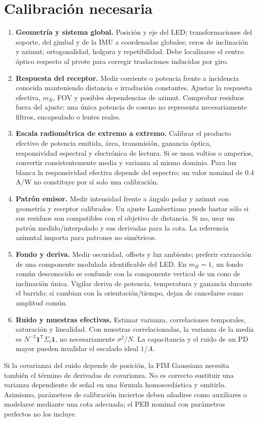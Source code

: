 \documentclass[11pt,a4paper]{article}
\begin{document}
\section{Calibración necesaria}
\begin{enumerate}
\item \textbf{Geometría y sistema global.} Posición y eje del LED; transformaciones del soporte, del gimbal y de la IMU a coordenadas globales; ceros de inclinación y azimut; ortogonalidad, holgura y repetibilidad. Debe localizarse el centro óptico respecto al pivote para corregir traslaciones inducidas por giro.
\item \textbf{Respuesta del receptor.} Medir corriente o potencia frente a incidencia conocida manteniendo distancia e irradiación constantes. Ajustar la respuesta efectiva, $m_R$, FOV y posibles dependencias de azimut. Comprobar residuos fuera del ajuste: una única potencia de coseno no representa necesariamente filtros, encapsulado o lentes reales.
\item \textbf{Escala radiométrica de extremo a extremo.} Calibrar el producto efectivo de potencia emitida, área, transmisión, ganancia óptica, responsividad espectral y electrónica de lectura. Si se usan voltios o amperios, convertir consistentemente media y varianza al mismo dominio. Para luz blanca la responsividad efectiva depende del espectro; un valor nominal de 0.4 A/W no constituye por sí solo una calibración.
\item \textbf{Patrón emisor.} Medir intensidad frente a ángulo polar y azimut con geometría y receptor calibrados. Un ajuste Lambertiano puede bastar sólo si sus residuos son compatibles con el objetivo de distancia. Si no, usar un patrón medido/interpolado y sus derivadas para la cota. La referencia azimutal importa para patrones no simétricos.
\item \textbf{Fondo y deriva.} Medir oscuridad, offsets y luz ambiente; preferir extracción de una componente modulada identificable del LED. En $m_R=1$, un fondo común desconocido se confunde con la componente vertical de un cono de inclinación única. Vigilar deriva de potencia, temperatura y ganancia durante el barrido; si cambian con la orientación/tiempo, dejan de cancelarse como amplitud común.
\item \textbf{Ruido y muestras efectivas.} Estimar varianza, correlaciones temporales, saturación y linealidad. Con muestras correlacionadas, la varianza de la media es $N^{-2}\mathbf1^{\mathsf T}\Sigma_t\mathbf1$, no necesariamente $\sigma^2/N$. La capacitancia y el ruido de un PD mayor pueden invalidar el escalado ideal $1/A$.
\end{enumerate}
Si la covarianza del ruido depende de posición, la FIM Gaussiana necesita también el término de derivadas de covarianza. No es correcto sustituir una varianza dependiente de señal en una fórmula homoscedástica y omitirlo. Asimismo, parámetros de calibración inciertos deben añadirse como auxiliares o modelarse mediante una cota adecuada; el PEB nominal con parámetros perfectos no los incluye.
\end{document}
